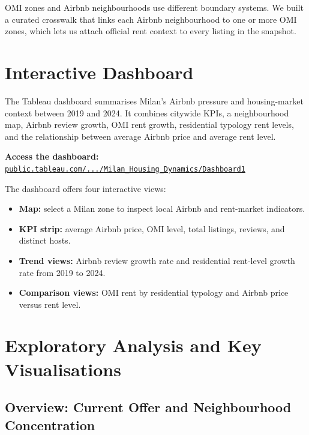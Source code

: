 \documentclass[11pt, a4paper]{article}
\begin{document}
OMI zones and Airbnb neighbourhoods use different boundary systems. We built a curated crosswalk
that links each Airbnb neighbourhood to one or more OMI zones, which lets us attach official rent
context to every listing in the snapshot.

\section{Interactive Dashboard}
\label{sec:dashboard}

The Tableau dashboard summarises Milan's Airbnb pressure and housing-market context between
2019 and 2024. It combines citywide KPIs, a neighbourhood map, Airbnb review growth, OMI rent
growth, residential typology rent levels, and the relationship between average Airbnb price and
average rent level.

\medskip
\noindent\textbf{Access the dashboard:}\\
\href{https://public.tableau.com/app/profile/michele.turco/viz/Milan_Housing_Dynamics/Dashboard1}%
{\texttt{public.tableau.com/.../Milan\_Housing\_Dynamics/Dashboard1}}

\medskip
The dashboard offers four interactive views:

\begin{itemize}[leftmargin=1.4em]
  \item \textbf{Map:} select a Milan zone to inspect local Airbnb and rent-market indicators.
  \item \textbf{KPI strip:} average Airbnb price, OMI level, total listings, reviews, and
        distinct hosts.
  \item \textbf{Trend views:} Airbnb review growth rate and residential rent-level growth rate
        from 2019 to 2024.
  \item \textbf{Comparison views:} OMI rent by residential typology and Airbnb price versus
        rent level.
\end{itemize}

\section{Exploratory Analysis and Key Visualisations}
\label{sec:eda}

\subsection{Overview: Current Offer and Neighbourhood Concentration}
\end{document}
